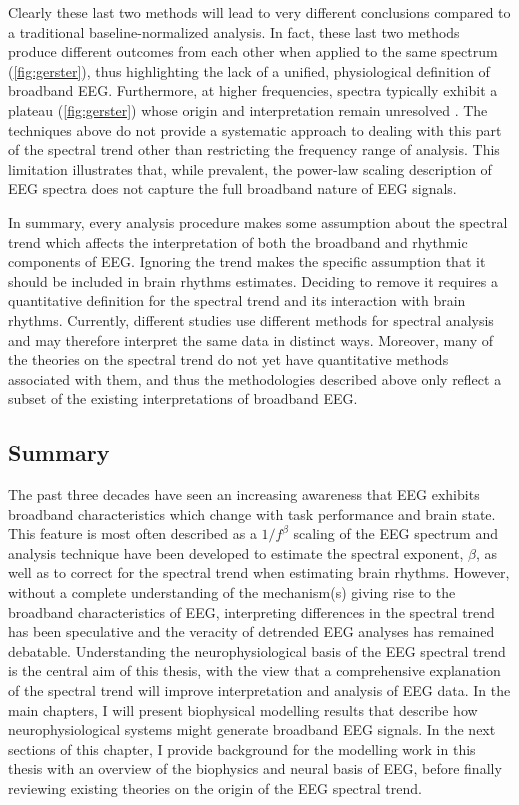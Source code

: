 Clearly these last two methods will lead to very different conclusions compared to a traditional baseline-normalized analysis. In fact, these last two methods produce different outcomes from each other when applied to the same spectrum (\autoref{fig:gerster}), thus highlighting the lack of a unified, physiological definition of broadband EEG. Furthermore, at higher frequencies, spectra typically exhibit a plateau  (\autoref{fig:gerster}) whose origin and interpretation remain unresolved \cite{Gerster2022}. The techniques above do not provide a systematic approach to dealing with this part of the spectral trend other than restricting the frequency range of analysis. This limitation illustrates that, while prevalent, the power-law scaling description of EEG spectra does not capture the full broadband nature of EEG signals. 

In summary, every analysis procedure makes some assumption about the spectral trend which affects the interpretation of both the broadband and rhythmic components of EEG. Ignoring the trend makes the specific assumption that it should be included in brain rhythms estimates. Deciding to remove it requires a quantitative definition for the spectral trend and its interaction with brain rhythms. Currently, different studies use different methods for spectral analysis and may therefore interpret the same data in distinct ways. Moreover, many of the theories on the spectral trend do not yet have quantitative methods associated with them, and thus the methodologies described above only reflect a subset of the existing interpretations of broadband EEG.

\subsection{Summary}
The past three decades have seen an increasing awareness that EEG exhibits broadband characteristics which change with task performance and brain state. This feature is most often described as a $1/f^\beta$ scaling of the EEG spectrum and analysis technique have been developed to estimate the spectral exponent, $\beta$, as well as to correct for the spectral trend when estimating brain rhythms. However, without a complete understanding of the mechanism(s) giving rise to the broadband characteristics of EEG, interpreting differences in the spectral trend has been speculative and the veracity of detrended EEG analyses has remained debatable. Understanding the neurophysiological basis of the EEG spectral trend is the central aim of this thesis, with the view that a comprehensive explanation of the spectral trend will improve interpretation and analysis of EEG data. In the main chapters, I will present biophysical modelling results that describe how neurophysiological systems might generate broadband EEG signals. In the next sections of this chapter, I provide background for the modelling work in this thesis with an overview of the biophysics and neural basis of EEG, before finally reviewing existing theories on the origin of the EEG spectral trend.

